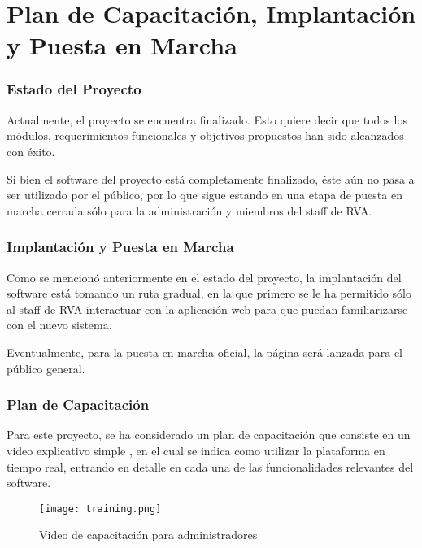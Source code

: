 \chapter{Plan de Capacitación, Implantación y Puesta en Marcha}

\subsection{Estado del Proyecto}
Actualmente, el proyecto se encuentra finalizado. Esto quiere decir que todos los módulos, requerimientos funcionales y objetivos propuestos han sido alcanzados con éxito.

Si bien el software del proyecto está completamente finalizado, éste aún no pasa a ser utilizado por el público, por lo que sigue estando en una etapa de puesta en marcha cerrada sólo para la administración y miembros del staff de RVA.

\subsection{Implantación y Puesta en Marcha}
Como se mencionó anteriormente en el estado del proyecto, la implantación del software está tomando un ruta gradual, en la que primero se le ha permitido sólo al staff de RVA interactuar con la aplicación web para que puedan familiarizarse con el nuevo sistema.

Eventualmente, para la puesta en marcha oficial, la página será lanzada para el público general.

\subsection{Plan de Capacitación}
Para este proyecto, se ha considerado un plan de capacitación que consiste en un video explicativo simple \cite{adminwalkthrough}, en el cual se indica como utilizar la plataforma en tiempo real, entrando en detalle en cada una de las funcionalidades relevantes del software.

\begin{figure}[H]
  \begin{center}
    \texttt{[image: training.png]}
  \end{center}
  \caption[Video de capacitación para administradores]{Video de capacitación para administradores}
  \label{fig:training}
\end{figure}

